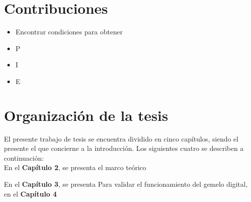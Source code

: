 \section{Contribuciones}
\begin{itemize}
    \item Encontrar condiciones para obtener 
    \item P
    \item I
    \item E
  \end{itemize}

\section{Organización de la tesis}
El presente trabajo de tesis se encuentra dividido en cinco capítulos,
siendo el presente el que concierne a la introducción. Los siguientes cuatro
 se describen a continuación:\\

En el \textbf{Capítulo 2}, se presenta el marco teórico 

En el \textbf{Capítulo 3}, se presenta 
Para validar el funcionamiento del gemelo digital, en el \textbf{Capítulo 4} 

